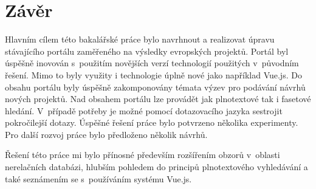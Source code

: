\chapter{Závěr}
Hlavním cílem této bakalářské práce bylo navrhnout a realizovat úpravu stávajícího portálu zaměřeného na výsledky evropských projektů. Portál byl úspěšně inovován s~použitím novějších verzí technologií použitých v~původním řešení. Mimo to byly využity i technologie úplně nové jako například Vue.js. Do obsahu portálu byly úspěšně zakomponovány témata výzev pro podávání návrhů nových projektů. Nad obsahem portálu lze provádět jak plnotextové tak i fasetové hledání. V~případě potřeby je možné pomocí dotazovacího jazyka sestrojit pokročilejší dotazy. Úspěšné řešení práce bylo potvrzeno několika experimenty. Pro další rozvoj práce bylo předloženo několik návrhů.

Řešení této práce mi bylo přínosné především rozšířením obzorů v~oblasti nerelačních databázi, hlubším pohledem do principů plnotextového vyhledávání a také seznámením se s~používáním systému Vue.js.